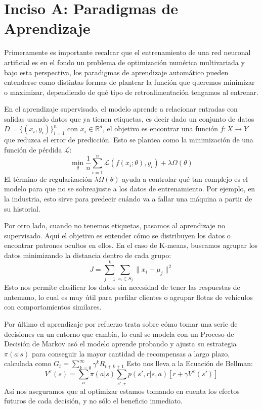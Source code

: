\section{Inciso A: Paradigmas de Aprendizaje}

Primeramente es importante recalcar que el entrenamiento de una red neuronal artificial es en el fondo un problema de optimización numérica multivariada y bajo esta perspectiva, los paradigmas de aprendizaje automático pueden entenderse como distintas formas de plantear la función que queremos minimizar o maximizar, dependiendo de qué tipo de retroalimentación tengamos al entrenar.

En el aprendizaje supervisado, el modelo aprende a relacionar entradas con salidas usando datos que ya tienen etiquetas, es decir dado un conjunto de datos $D = \{(x_i, y_i)\}_{i=1}^n$ con $x_i \in \mathbb{R}^d$, el objetivo es encontrar una función $f: X \to Y$ que reduzca el error de predicción. Esto se plantea como la minimización de una función de pérdida $\mathcal{L}$:
\begin{equation}
    \min_{\theta} \frac{1}{n} \sum_{i=1}^{n} \mathcal{L}(f(x_i; \theta), y_i) + \lambda \Omega(\theta)
\end{equation}
El término de regularización $\lambda \Omega(\theta)$ ayuda a controlar qué tan complejo es el modelo para que no se sobreajuste a los datos de entrenamiento. Por ejemplo, en la industria, esto sirve para predecir cuándo va a fallar una máquina a partir de su historial.

Por otro lado, cuando no tenemos etiquetas, pasamos al aprendizaje no supervisado. Aquí el objetivo es entender cómo se distribuyen los datos o encontrar patrones ocultos en ellos. En el caso de K-means, buscamos agrupar los datos minimizando la distancia dentro de cada grupo:
\begin{equation}
    J = \sum_{j=1}^{k} \sum_{x_i \in S_j} \|x_i - \mu_j\|^2
\end{equation}
Esto nos permite clasificar los datos sin necesidad de tener las respuestas de antemano, lo cual es muy útil para perfilar clientes o agrupar flotas de vehículos con comportamientos similares.

Por último el aprendizaje por refuerzo trata sobre cómo tomar una serie de decisiones en un entorno que cambia, lo cual se modela con un Proceso de Decisión de Markov asó el modelo aprende probando y ajusta su estrategia $\pi(a|s)$ para conseguir la mayor cantidad de recompensas a largo plazo, calculada como $G_t = \sum_{k=0}^{\infty} \gamma^k R_{t+k+1}$ Esto nos lleva a la Ecuación de Bellman:
\begin{equation}
    V^\pi(s) = \sum_{a} \pi(a|s) \sum_{s', r} p(s', r | s, a) [r + \gamma V^\pi(s')]
\end{equation}
Así nos aseguramos que al optimizar estamos tomando en cuenta los efectos futuros de cada decisión, y no sólo el beneficio inmediato.
